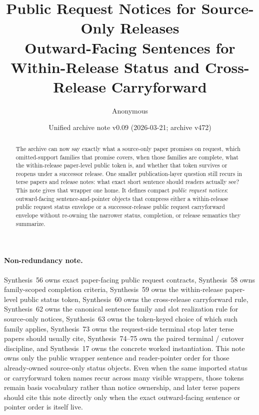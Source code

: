 \documentclass[11pt]{article}
\title{Public Request Notices for Source-Only Releases\\\large Outward-Facing Sentences for Within-Release Status and Cross-Release Carryforward}
\author{Anonymous}
\date{Unified archive note v0.09 (2026-03-21; archive v472)}
\begin{document}
\maketitle

\begin{abstract}
The archive can now say exactly what a source-only paper promises on request, which omitted-support families that promise covers, when those families are complete, what the within-release paper-level public token is, and whether that token survives or reopens under a successor release. One smaller publication-layer question still recurs in terse papers and release notes: what exact short sentence should readers actually see? This note gives that wrapper one home. It defines compact \emph{public request notices}: outward-facing sentence-and-pointer objects that compress either a within-release public request status envelope or a successor-release public request carryforward envelope without re-owning the narrower status, completion, or release semantics they summarize.
\end{abstract}

\paragraph{Non-redundancy note.}
Synthesis~56 owns exact paper-facing public request contracts, Synthesis~58 owns family-scoped completion criteria, Synthesis~59 owns the within-release paper-level public status token, Synthesis~60 owns the cross-release carryforward rule, Synthesis~62 owns the canonical sentence family and slot realization rule for source-only notices, Synthesis~63 owns the token-keyed choice of which such family applies, Synthesis~73 owns the request-side terminal stop later terse papers should usually cite, Synthesis~74--75 own the paired terminal / cutover discipline, and Synthesis~17 owns the concrete worked instantiation.\cite{series:publicrequestcontracts,series:requestfulfillmentcertificates,series:publicrequeststatusenvelopes,series:publicrequestcarryforward,series:publicrequestnoticenormalforms,series:publicrequestnoticeselections,series:publicrequestresponsepacketrefreshresponsepacketclosureverdicts,series:pairedterminalcitationdiscipline,series:pairedterminalcutoverrule,series:workedexample}
This note owns only the public wrapper sentence and reader-pointer order for those already-owned source-only status objects. Even when the same imported status or carryforward token names recur across many visible wrappers, those tokens remain basis vocabulary rather than notice ownership, and later terse papers should cite this note directly only when the exact outward-facing sentence or pointer order is itself live.
\end{document}
